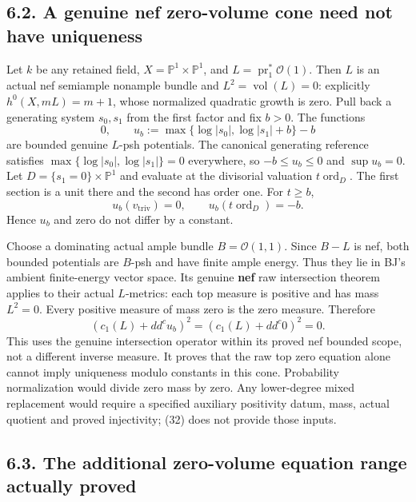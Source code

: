 \documentclass[
  10pt,
]{article}
\begin{document}
\subsection{6.2. A genuine nef zero-volume cone need not have
uniqueness}\label{a-genuine-nef-zero-volume-cone-need-not-have-uniqueness}

Let \(k\) be any retained field, \(X=\mathbb P^1\times\mathbb P^1\), and
\(L=\operatorname{pr}_1^*\mathcal O(1)\). Then \(L\) is an actual nef
semiample nonample bundle and \(L^2=\operatorname{vol}(L)=0\):
explicitly \(h^0(X,mL)=m+1\), whose normalized quadratic growth is zero.
Pull back a generating system \(s_0,s_1\) from the first factor and fix
\(b>0\). The functions \[
 0,\qquad u_b:=\max\{\log|s_0|,\log|s_1|+b\}-b
 \tag{30}
\] are bounded genuine \(L\)-psh potentials. The canonical generating
reference satisfies \(\max\{\log|s_0|,\log|s_1|\}=0\) everywhere, so
\(-b\le u_b\le0\) and \(\sup u_b=0\). Let
\(D=\{s_1=0\}\times\mathbb P^1\) and evaluate at the divisorial
valuation \(t\operatorname{ord}_D\). The first section is a unit there
and the second has order one. For \(t\ge b\),
\[ u_b(v_{\mathrm{triv}})=0,\qquad u_b(t\operatorname{ord}_D)=-b. \tag{31} \]
Hence \(u_b\) and zero do not differ by a constant.

Choose a dominating actual ample bundle \(B=\mathcal O(1,1)\). Since
\(B-L\) is nef, both bounded potentials are \(B\)-psh and have finite
ample energy. Thus they lie in BJ's ambient finite-energy vector space.
Its genuine \textbf{nef} raw intersection theorem applies to their
actual \(L\)-metrics: each top measure is positive and has mass
\(L^2=0\). Every positive measure of mass zero is the zero measure.
Therefore \[ (c_1(L)+dd^cu_b)^2=(c_1(L)+dd^c0)^2=0. \tag{32} \] This
uses the genuine intersection operator within its proved nef bounded
scope, not a different inverse measure. It proves that the raw top zero
equation alone cannot imply uniqueness modulo constants in this cone.
Probability normalization would divide zero mass by zero. Any
lower-degree mixed replacement would require a specified auxiliary
positivity datum, mass, actual quotient and proved injectivity; (32)
does not provide those inputs.

\subsection{6.3. The additional zero-volume equation range actually
proved}\label{the-additional-zero-volume-equation-range-actually-proved}
\end{document}

